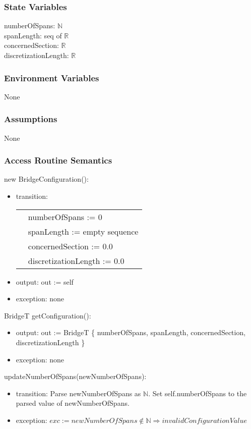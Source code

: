 \documentclass[12pt, titlepage]{article}
\begin{document}
\subsubsection{State Variables}
numberOfSpans: $\mathbb{N}$\\
spanLength: seq of $\mathbb{R}$ \\
concernedSection: $\mathbb{R}$\\
discretizationLength: $\mathbb{R}$\\

\subsubsection{Environment Variables}
None
\subsubsection{Assumptions}
None
\subsubsection{Access Routine Semantics}

\noindent new BridgeConfiguration():
\begin{itemize}
\item transition:\\
        \begin{tabular}{p{1cm} p{8cm}}
		& numberOfSpans := 0\\
		& spanLength := empty sequence\\
		& concernedSection := 0.0\\
		& discretizationLength := 0.0\\
        \end{tabular}
\item output: out := self
\item exception: none
\end{itemize}

\noindent BridgeT getConfiguration():
\begin{itemize}
\item output: out := BridgeT \{ numberOfSpans, spanLength, concernedSection, discretizationLength \}
\item exception: none
\end{itemize}

\noindent updateNumberOfSpans(newNumberOfSpans):
\begin{itemize}
\item transition: Parse newNumberOfSpans as $\mathbb{N}$. Set self.numberOfSpans to the parsed value of newNumberOfSpans.
\item exception: $exc := newNumberOfSpans \notin \mathbb{N} \Rightarrow invalidConfigurationValue$
\end{itemize}
\end{document}
